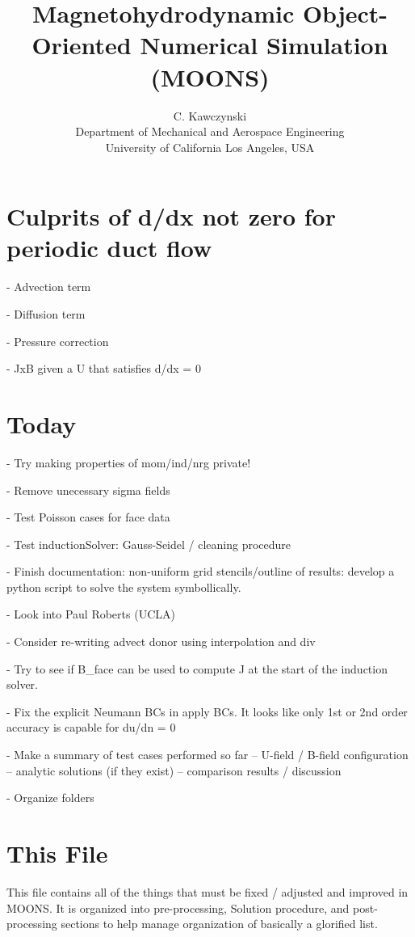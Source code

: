 \documentclass[11pt]{article}
\begin{document}
\doublespacing
\title{Magnetohydrodynamic Object-Oriented Numerical Simulation (MOONS)}
\author{C. Kawczynski \\
Department of Mechanical and Aerospace Engineering \\
University of California Los Angeles, USA\\
}
\maketitle

\section{Culprits of d/dx not zero for periodic duct flow}

- Advection term

- Diffusion term

- Pressure correction

- JxB given a U that satisfies d/dx = 0

\section{Today}

- Try making properties of mom/ind/nrg private!

- Remove unecessary sigma fields

- Test Poisson cases for face data

- Test inductionSolver: Gauss-Seidel / cleaning procedure

- Finish documentation: non-uniform grid stencils/outline of results: develop a python script to solve the system symbollically.

- Look into Paul Roberts (UCLA)

- Consider re-writing advect donor using interpolation and div

- Try to see if B\_face can be used to compute J at the start of the induction solver.

- Fix the explicit Neumann BCs in apply BCs. It looks like only 1st or 2nd order accuracy is capable for du/dn = 0

- Make a summary of test cases performed so far
-- U-field / B-field configuration 
-- analytic solutions (if they exist)
-- comparison results / discussion

- Organize folders

\section{This File}
This file contains all of the things that must be fixed / adjusted and improved in MOONS. It is organized into pre-processing, Solution procedure, and post-processing sections to help manage organization of basically a glorified list.
\end{document}
